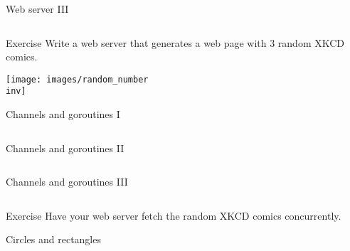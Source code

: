 \documentclass[10pt]{beamer}
\newcommand{\inv}{-inv}
\begin{document}
	
	\begin{frame}[t,fragile]{Web server III}
		\inputminted{go}{code/13_atomic.go}
	\end{frame}
	
	
	\begin{frame}[fragile]{Exercise}
		Write a web server that generates a web page with 3 random XKCD comics.\\
		\begin{center}
			\texttt{[image: images/random\_number\\inv]}
		\end{center}
	\end{frame}
							
	
	\begin{frame}[t,fragile]{Channels and goroutines I}
		\inputminted{go}{code/14_stack.go}
	\end{frame}
								
	
	\begin{frame}[t,fragile]{Channels and goroutines II}
		\inputminted[firstnumber=last,fontsize=\footnotesize]{go}{code/14b_stack.go}
	\end{frame}
									
	
	\begin{frame}[t,fragile]{Channels and goroutines III}
		\inputminted[firstnumber=last,fontsize=\footnotesize]{go}{code/14c_stack.go}
	\end{frame}
	
	
	\begin{frame}[fragile]{Exercise}
		Have your web server fetch the random XKCD comics concurrently.
	\end{frame}
							
	
	\begin{frame}[t,fragile]{Circles and rectangles}
		\inputminted[fontsize=\scriptsize]{go}{code/15_shapes.go}
	\end{frame}
	
\end{document}
